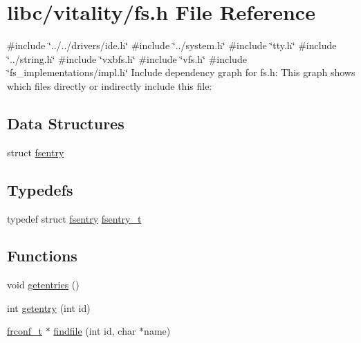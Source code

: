 \hypertarget{a00146}{}\section{libc/vitality/fs.h File Reference}
\label{a00146}
{\ttfamily \#include \char`\"{}../../drivers/ide.\+h\char`\"{}}\newline
{\ttfamily \#include \char`\"{}../system.\+h\char`\"{}}\newline
{\ttfamily \#include \char`\"{}tty.\+h\char`\"{}}\newline
{\ttfamily \#include \char`\"{}../string.\+h\char`\"{}}\newline
{\ttfamily \#include \char`\"{}vxbfs.\+h\char`\"{}}\newline
{\ttfamily \#include \char`\"{}vfs.\+h\char`\"{}}\newline
{\ttfamily \#include \char`\"{}fs\+\_\+implementations/impl.\+h\char`\"{}}\newline
Include dependency graph for fs.\+h\+:
This graph shows which files directly or indirectly include this file\+:
\subsection*{Data Structures}
\begin{DoxyCompactItemize}
\item 
struct \hyperlink{a00262}{fsentry}
\end{DoxyCompactItemize}
\subsection*{Typedefs}
\begin{DoxyCompactItemize}
\item 
typedef struct \hyperlink{a00262}{fsentry} \hyperlink{a00146_a9ccf6560e8aebea3e4402a31e8c0f46b_a9ccf6560e8aebea3e4402a31e8c0f46b}{fsentry\+\_\+t}
\end{DoxyCompactItemize}
\subsection*{Functions}
\begin{DoxyCompactItemize}
\item 
void \hyperlink{a00146_a414110036132977c34813673360e1a63_a414110036132977c34813673360e1a63}{getentries} ()
\item 
int \hyperlink{a00146_a3fb32d07d3bd05144a196c94fc59c0d1_a3fb32d07d3bd05144a196c94fc59c0d1}{getentry} (int id)
\item 
\hyperlink{a00185_a752f1bef3c13b98d682fddc44a9e47c8_a752f1bef3c13b98d682fddc44a9e47c8}{frconf\+\_\+t} $\ast$ \hyperlink{a00146_a5c15724e6f3ef2c0df67ccedfc8639eb_a5c15724e6f3ef2c0df67ccedfc8639eb}{findfile} (int id, char $\ast$name)
\end{DoxyCompactItemize}
